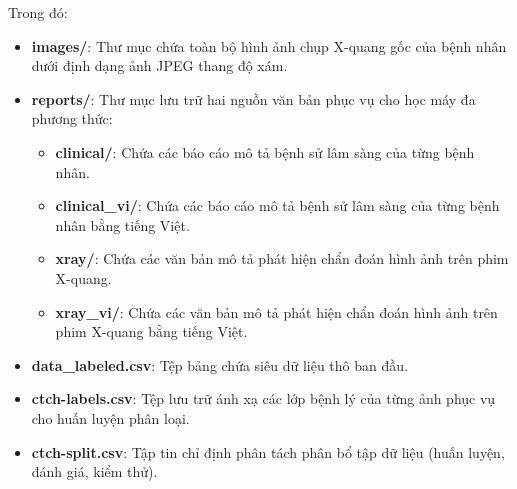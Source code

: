 Trong đó:
\begin{itemize}
    \item \textbf{images/}: Thư mục chứa toàn bộ hình ảnh chụp X-quang gốc của bệnh nhân dưới định dạng ảnh JPEG thang độ xám.
    \item \textbf{reports/}: Thư mục lưu trữ hai nguồn văn bản phục vụ cho học máy đa phương thức:
    \begin{itemize}
        \item \textbf{clinical/}: Chứa các báo cáo mô tả bệnh sử lâm sàng của từng bệnh nhân.
        \item \textbf{clinical\_vi/}: Chứa các báo cáo mô tả bệnh sử lâm sàng của từng bệnh nhân bằng tiếng Việt.
        \item \textbf{xray/}: Chứa các văn bản mô tả phát hiện chẩn đoán hình ảnh trên phim X-quang.
        \item \textbf{xray\_vi/}: Chứa các văn bản mô tả phát hiện chẩn đoán hình ảnh trên phim X-quang bằng tiếng Việt.
    \end{itemize}
    \item \textbf{data\_labeled.csv}: Tệp bảng chứa siêu dữ liệu thô ban đầu.
    \item \textbf{ctch-labels.csv}: Tệp lưu trữ ánh xạ các lớp bệnh lý của từng ảnh phục vụ cho huấn luyện phân loại.
    \item \textbf{ctch-split.csv}: Tập tin chỉ định phân tách phân bổ tập dữ liệu (huấn luyện, đánh giá, kiểm thử).
\end{itemize}

